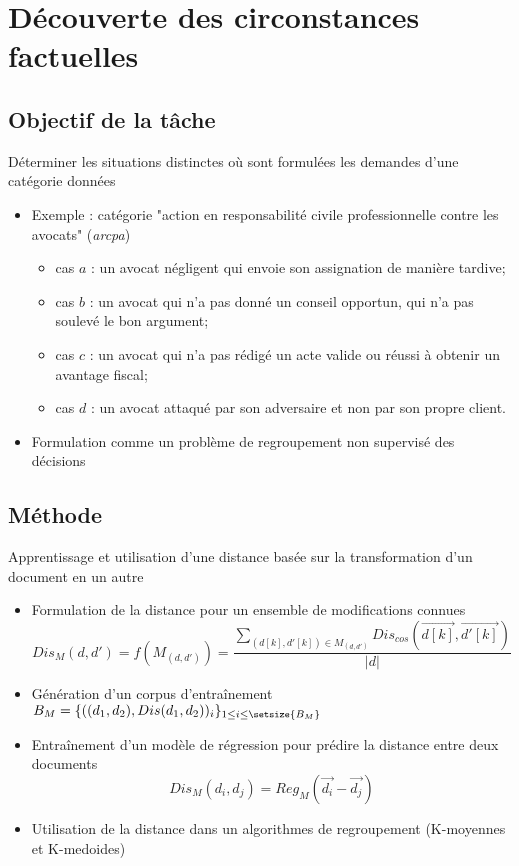 \section{Découverte des circonstances factuelles}
\subsection{Objectif de la tâche}
\begin{frame}[t]{\mysubsectiontitle}
	Déterminer les situations distinctes où sont formulées les demandes d'une catégorie données
	\begin{itemize} \scriptsize
		\item Exemple : catégorie "action en responsabilité civile professionnelle contre les avocats" (\textit{arcpa})
			\begin{itemize}\scriptsize
				\item cas $a$ : un avocat négligent qui envoie son assignation de manière tardive; 
				\item cas $b$ : un avocat qui n'a pas donné un conseil opportun, qui n'a pas soulevé le bon argument;
				\item cas $c$ : un avocat qui n'a pas rédigé un acte valide ou réussi à obtenir un avantage fiscal; 
				\item cas $d$ : un avocat attaqué par son adversaire et non par son propre client.
			\end{itemize}
		\item Formulation comme un problème de regroupement non supervisé des décisions
	\end{itemize}
\end{frame}
\subsection{Méthode}
\begin{frame}[t]{\mysubsectiontitle}
	Apprentissage et utilisation d'une distance basée sur la transformation d'un document en un autre
	\begin{itemize} \scriptsize
		\item Formulation de la distance pour un ensemble de modifications connues	
		\[{Dis_{M}}(d,d') = {f}({M}_{(d,d')}) = \frac{\sum\limits_{(d[k], d'[k]) \in {M}_{(d,d')}} Dis_{cos}(\overrightarrow{d[k]}, \overrightarrow{d'[k]})}{\vert d \vert}\] 
		\item Génération d'un corpus d'entraînement	$B_{M} = \lbrace ((d_1, d_2), {Dis}(d_1, d_2))_i\rbrace_{1 \leq i \leq \setsize{B_{M}}}$
		\item Entraînement d'un modèle de régression pour prédire la distance entre deux documents \[Dis_{M}(d_i, d_j) = Reg_{M}(\vec{d_{i}} - \vec{d_{j}})\]	
		\item Utilisation de la distance dans un algorithmes de regroupement (K-moyennes et K-medoides)
	\end{itemize}	
\end{frame}

